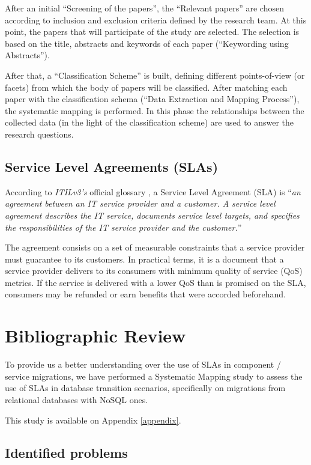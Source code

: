 \documentclass{article}
\begin{document}
After an initial ``Screening of the papers'', the ``Relevant papers'' are chosen according to inclusion and exclusion criteria defined by the research team. 
At this point, the papers that will participate of the study are selected. 
The selection is based on the title, abstracts and keywords of each paper (``Keywording using Abstracts'').

After that, a ``Classification Scheme'' is built, defining different points-of-view (or facets) from which the body of papers will be classified. 
After matching each paper with the classification schema (``Data Extraction and Mapping Process''), the  systematic mapping is performed.
In this phase the relationships between the collected data (in the light of the classification scheme) are used to answer the research questions.


\subsection*{Service Level Agreements (SLAs)}
According to \textit{ITILv3's} official glossary \cite{itilv3glossary}, a Service Level Agreement (SLA) is ``\textit{an agreement between an IT service provider and a customer. 
A service level agreement describes the IT service, documents service level targets, and specifies the responsibilities of the IT service provider and the customer.}'' 

The agreement consists on a set of measurable constraints that a service provider must guarantee to its customers.
In practical terms, it is a document that a service provider delivers to its consumers with minimum quality of service (QoS) metrics. 
If the service is delivered with a lower QoS than is promised on the SLA, consumers may be refunded or earn benefits that were accorded beforehand.    

\section{Bibliographic Review}\label{bibreview}

To provide us a better understanding over the use of SLAs in component / service migrations, we have performed a Systematic Mapping study to assess the use of SLAs in database transition scenarios, specifically on migrations from relational databases with NoSQL ones. 

This study is available on Appendix \ref{appendix}. 

\subsection{Identified problems}
\end{document}
